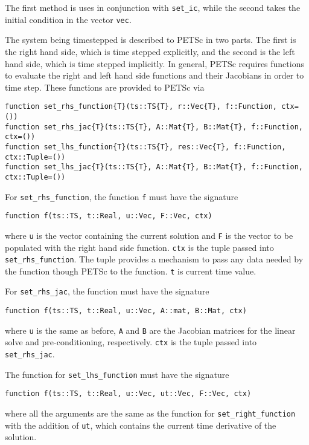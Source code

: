 \documentclass{article}
\begin{document}
The first method is uses in conjunction with \texttt{set\_ic}, while the 
second takes the initial condition in the vector \texttt{vec}.

The system being timestepped is described to PETSc in two parts.  The first is 
the right hand side, which is time stepped explicitly, and the second is the 
left hand side, which is time stepped implicitly.  In general, PETSc requires 
functions to evaluate the right and left hand side functions and their 
Jacobians  in order to time step.  These functions are provided to PETSc via

\begin{verbatim}
function set_rhs_function{T}(ts::TS{T}, r::Vec{T}, f::Function, ctx=())
function set_rhs_jac{T}(ts::TS{T}, A::Mat{T}, B::Mat{T}, f::Function, ctx=())
function set_lhs_function{T}(ts::TS{T}, res::Vec{T}, f::Function, ctx::Tuple=())
function set_lhs_jac{T}(ts::TS{T}, A::Mat{T}, B::Mat{T}, f::Function, ctx::Tuple=())
\end{verbatim}
For \texttt{set\_rhs\_function}, the function \texttt{f} must have the 
signature

\begin{verbatim}
function f(ts::TS, t::Real, u::Vec, F::Vec, ctx)
\end{verbatim}

where \texttt{u} is the vector containing the current solution and \texttt{F}
is the vector to be populated with the right hand side function.  \texttt{ctx}
is the tuple passed into \texttt{set\_rhs\_function}.  The tuple provides a 
mechanism to pass any data needed by the function though PETSc to the function.
\texttt{t} is current time value.

For \texttt{set\_rhs\_jac}, the function must have the signature

\begin{verbatim}
function f(ts::TS, t::Real, u::Vec, A::mat, B::Mat, ctx)
\end{verbatim}

\noindent where \texttt{u} is the same as before, \texttt{A} and \texttt{B} are the 
Jacobian matrices for the linear solve and pre-conditioning, respectively.  
\texttt{ctx} is the tuple passed into \texttt{set\_rhs\_jac}.

The function for \texttt{set\_lhs\_function} must have the signature

\begin{verbatim}
function f(ts::TS, t::Real, u::Vec, ut::Vec, F::Vec, ctx)
\end{verbatim}
\noindent where all the arguments are the same as the function for 
\texttt{set\_right\_function} with the addition of \texttt{ut}, which contains
the current time derivative of the solution.
\end{document}
